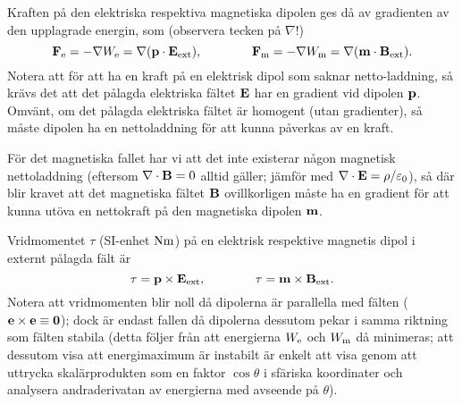 Kraften p{\aa} den elektriska respektiva magnetiska dipolen ges d{\aa} av
gradienten av den upplagrade energin, som (observera tecken p{\aa} $\nabla$!)%
$$
  {\bf F}_{\rm e} = -\nabla W_{\rm e}
    =\nabla({\bf p}\cdot{\bf E}_{\rm ext}),\qquad\qquad
  {\bf F}_{\rm m} = -\nabla W_{\rm m}
    =\nabla({\bf m}\cdot{\bf B}_{\rm ext}).
$$
Notera att f{\"o}r att ha en kraft p{\aa} en elektrisk dipol som saknar
netto-laddning, s{\aa} kr{\"a}vs det att det p{\aa}lagda elektriska f{\"a}ltet
${\bf E}$ har en gradient vid dipolen ${\bf p}$. Omv{\"a}nt, om det p{\aa}lagda
elektriska f{\"a}ltet {\"a}r homogent (utan gradienter), s{\aa} m{\aa}ste
dipolen ha en nettoladdning f{\"o}r att kunna p{\aa}verkas av en kraft.

F{\"o}r det magnetiska fallet har vi att det inte existerar n{\aa}gon magnetisk
nettoladdning (eftersom $\nabla\cdot{\bf B}=0$ alltid g{\"a}ller;
j{\"a}mf{\"o}r med $\nabla\cdot{\bf E}=\rho/\varepsilon_0$), s{\aa} d{\"a}r
blir kravet att det magnetiska f{\"a}ltet ${\bf B}$ ovillkorligen m{\aa}ste ha
en gradient f{\"o}r att kunna ut{\"o}va en nettokraft p{\aa} den magnetiska
dipolen ${\bf m}$.

Vridmomentet $\tau$ (SI-enhet ${\rm N}{\rm m}$) p{\aa} en elektrisk respektive
magnetis dipol i externt p{\aa}lagda f{\"a}lt {\"a}r
$$
  {\bf \tau}={\bf p}\times{\bf E}_{\rm ext},\qquad\qquad
  {\bf \tau}={\bf m}\times{\bf B}_{\rm ext}.
$$
Notera att vridmomenten blir noll d{\aa} dipolerna {\"a}r parallella med
f{\"a}lten (${\bf e}\times{\bf e}\equiv{\bf 0}$); dock {\"a}r endast fallen
d{\aa} dipolerna dessutom pekar i samma riktning som f{\"a}lten stabila (detta
f{\"o}ljer fr{\aa}n att energierna $W_{\rm e}$ och $W_{\rm m}$ d{\aa} minimeras;
att dessutom visa att energimaximum {\"a}r instabilt {\"a}r enkelt att visa
genom att uttrycka skal{\"a}rprodukten som en faktor $\cos\theta$ i sf{\"a}riska
koordinater och analysera andraderivatan av energierna med avseende p{\aa}
$\theta$).

